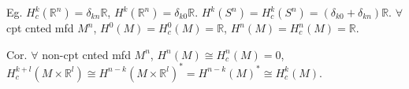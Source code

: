 Eg. $H_c^k(\mathbb{R}^n) = \delta_{kn} \mathbb{R}$, $H^k(\mathbb{R}^n) = \delta_{k0} \mathbb{R}$. $H^k(S^n) = H_c^k(S^n) = (\delta_{k0} + \delta_{kn}) \mathbb{R}$. $\forall$ cpt cnted mfd $M^n$, $H^0(M) = H_c^0(M) = \mathbb{R}$, $H^n(M) = H_c^n(M) = \mathbb{R}$.

Cor. $\forall$ non-cpt cnted mfd $M^n$, $H^n(M) \cong H_c^n(M) = 0$, $H_c^{k+l}(M \times \mathbb{R}^l) \cong H^{n-k}(M \times \mathbb{R}^l)^* = H^{n-k}(M)^* \cong H_c^k(M)$.